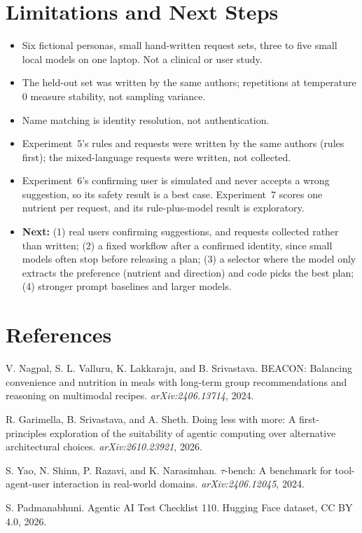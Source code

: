 \documentclass[11pt]{article}
\begin{document}
\section{Limitations and Next Steps}
\begin{itemize}
  \item Six fictional personas, small hand-written request sets, three to five
        small local models on one laptop. Not a clinical or user study.
  \item The held-out set was written by the same authors; repetitions at
        temperature 0 measure stability, not sampling variance.
  \item Name matching is identity resolution, not authentication.
  \item Experiment~5's rules and requests were written by the same authors
        (rules first); the mixed-language requests were written, not collected.
  \item Experiment~6's confirming user is simulated and never accepts a wrong
        suggestion, so its safety result is a best case. Experiment~7 scores
        one nutrient per request, and its rule-plus-model result is
        exploratory.
  \item \textbf{Next:} (1) real users confirming suggestions, and requests
        collected rather than written; (2) a fixed workflow after a confirmed
        identity, since small models often stop before releasing a plan;
        (3) a selector where the model only extracts the preference (nutrient
        and direction) and code picks the best plan; (4) stronger prompt
        baselines and larger models.
\end{itemize}

\section*{References}
\begin{enumerate}[label={[\arabic*]}, leftmargin=2.2em]
  \item V. Nagpal, S. L. Valluru, K. Lakkaraju, and B. Srivastava. BEACON:
        Balancing convenience and nutrition in meals with long-term group
        recommendations and reasoning on multimodal recipes.
        \emph{arXiv:2406.13714}, 2024.
  \item R. Garimella, B. Srivastava, and A. Sheth. Doing less with more: A
        first-principles exploration of the suitability of agentic computing
        over alternative architectural choices. \emph{arXiv:2610.23921}, 2026.
  \item S. Yao, N. Shinn, P. Razavi, and K. Narasimhan. $\tau$-bench: A benchmark
        for tool-agent-user interaction in real-world domains.
        \emph{arXiv:2406.12045}, 2024.
  \item S. Padmanabhuni. Agentic AI Test Checklist 110. Hugging Face dataset,
        CC BY 4.0, 2026.
\end{enumerate}
\end{document}

